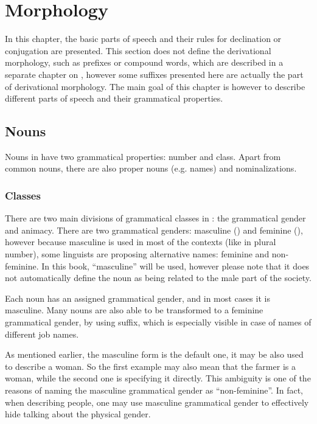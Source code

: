 \chapter{Morphology}
\label{ch:morphology}

In this chapter, the basic parts of speech and their rules for declination or
conjugation are presented. This section does not define the derivational
morphology, such as prefixes or compound words, which are described in a
separate chapter on , however some suffixes presented
here are actually the part of derivational morphology. The main goal of this
chapter is however to describe different parts of speech and their grammatical
properties.

\section{Nouns}

Nouns in \andro have two grammatical properties: number and class. Apart from
common nouns, there are also proper nouns (e.g. names) and nominalizations.

\subsection{Classes}

There are two main divisions of grammatical classes in \andro: the grammatical
gender and animacy. There are two grammatical genders: masculine (\M{}) and
feminine (\F{}), however because masculine is used in most of the contexts (like
in plural number), some linguists are proposing alternative names: feminine and
non-feminine. In this book, ``masculine'' will be used, however please note that
it does not automatically define the noun as being related to the male part of
the society.

Each noun has an assigned grammatical gender, and in most cases it is masculine.
Many nouns are also able to be transformed to a feminine grammatical gender, by
using  suffix, which is especially visible in case of names of different
job names.


As mentioned earlier, the masculine form is the default one, it may be also used
to describe a woman. So the first example may also mean that the farmer is a
woman, while the second one is specifying it directly. This ambiguity is one of
the reasons of naming the masculine grammatical gender as ``non-feminine''. In
fact, when describing people, one may use masculine grammatical gender to
effectively hide talking about the physical gender.

